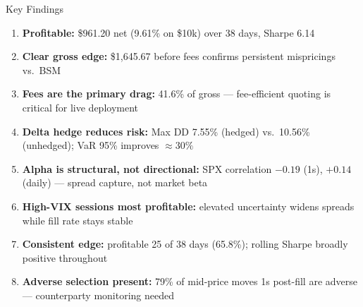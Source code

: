 \documentclass[aspectratio=169]{beamer}
\begin{document}
\begin{frame}{Key Findings}
  \begin{enumerate}\small
    \item \textbf{Profitable:} \$961.20 net (9.61\% on \$10k) over 38 days, Sharpe 6.14
    \item \textbf{Clear gross edge:} \$1,645.67 before fees confirms persistent mispricings vs.\ BSM
    \item \textbf{Fees are the primary drag:} 41.6\% of gross --- fee-efficient quoting is critical for live deployment
    \item \textbf{Delta hedge reduces risk:} Max DD 7.55\% (hedged) vs.\ 10.56\% (unhedged); VaR 95\% improves ${\approx}30\%$
    \item \textbf{Alpha is structural, not directional:} SPX correlation $-0.19$ (1s), $+0.14$ (daily) --- spread capture, not market beta
    \item \textbf{High-VIX sessions most profitable:} elevated uncertainty widens spreads while fill rate stays stable
    \item \textbf{Consistent edge:} profitable 25 of 38 days (65.8\%); rolling Sharpe broadly positive throughout
    \item \textbf{Adverse selection present:} 79\% of mid-price moves 1s post-fill are adverse --- counterparty monitoring needed
  \end{enumerate}
\end{frame}
\end{document}

